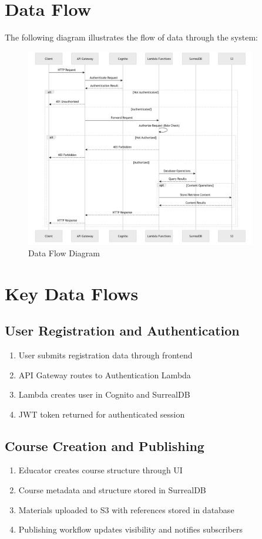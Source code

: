 \documentclass[a4paper, 11pt]{scrreprt}
\begin{document}
\section{Data Flow}
The following diagram illustrates the flow of data through the system:

\begin{figure}[ht]
    \centering
    \includegraphics[width=0.9\textwidth]{data_flow.png}
    \caption{Data Flow Diagram}
\end{figure}

\section{Key Data Flows}

\subsection{User Registration and Authentication}
\begin{enumerate}
    \item User submits registration data through frontend
    \item API Gateway routes to Authentication Lambda
    \item Lambda creates user in Cognito and SurrealDB
    \item JWT token returned for authenticated session
\end{enumerate}

\subsection{Course Creation and Publishing}
\begin{enumerate}
    \item Educator creates course structure through UI
    \item Course metadata and structure stored in SurrealDB
    \item Materials uploaded to S3 with references stored in database
    \item Publishing workflow updates visibility and notifies subscribers
\end{enumerate}
\end{document}
